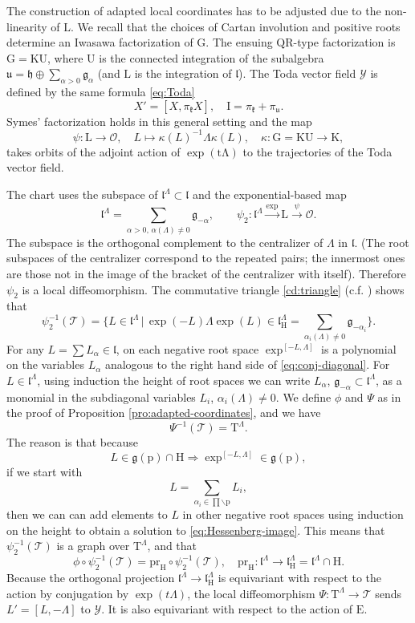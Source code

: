 \documentclass[reqno]{amsart}
\newcommand{\p}{\mathrm{p}}
\renewcommand{\gg}{\mathfrak{g}}
\newcommand{\hh}{\mathfrak{h}}
\newcommand{\kk}{\mathfrak{k}}
\renewcommand{\ll}{\mathfrak{l}}
\newcommand{\uu}{\mathfrak{u}}
\newcommand{\cO}{\mathcal{O}}
\newcommand{\cT}{\mathcal{T}}
\newcommand{\cY}{\mathcal{Y}}
\newcommand{\E}{\mathrm{E}}
\newcommand{\T}{\mathbb{T}}
\newcommand{\pr}{\mathrm{pr}}
\newcommand{\K}{\mathrm{K}}
\renewcommand{\L}{\mathrm{L}}
\renewcommand{\T}{\mathrm{T}}
\newcommand{\U}{\mathrm{U}}
\newcommand{\G}{\mathrm{G}}
\renewcommand{\H}{\mathrm{H}}
\begin{document}
The construction of adapted local coordinates has to be adjusted due to the non-linearity of $\L$. We recall that the choices of Cartan involution and positive roots determine an Iwasawa factorization of $\G$. The ensuing  $\mathrm{QR}$-type factorization is $\G=\K\U$, where $\U$ is the connected integration of the subalgebra $\uu=\hh\oplus\sum_{\alpha>0}\gg_\alpha$ (and $\L$ is the integration of $\ll$). The Toda vector field $\cY$ is defined by the same formula \eqref{eq:Toda}
\[X'=[X,\pi_{\kk}X],\quad \mathrm{I}=\pi_{\kk}+\pi_{\uu}.\]
Symes' factorization holds in this general setting and the map
\[\psi:\L\to \cO,\quad L\mapsto \kappa(L)^{-1}\Lambda \kappa(L),\quad \kappa:\G=\K\U\to  \K,\]
takes orbits of the adjoint action of $\mathrm{\exp(t\Lambda)}$ to the trajectories of the Toda vector field.

The chart uses the subspace of $\ll^\Lambda\subset \ll$ and the exponential-based map
\[ \ll^\Lambda=\sum_{\alpha>0,\,\alpha(\Lambda)\neq 0}\gg_{-\alpha},\qquad \psi_2:\ll^\Lambda\overset{\exp}{\longrightarrow} \L\overset{\psi}{\longrightarrow}\cO.\]
The subspace is the orthogonal complement to the centralizer of $\Lambda$ in $\ll$. (The root subspaces of the centralizer correspond to the repeated pairs; the innermost ones are those not in the image of the bracket of the centralizer with itself). Therefore   $\psi_2$ is a local diffeomorphism.
 The commutative triangle \eqref{cd:triangle} (c.f. \cite[Remark 6]{MT2}) shows that
\begin{equation}\label{eq:Hessenberg-image}\psi^{-1}_2(\cT)=\{L\in \ll^\Lambda\,|\, \exp(-L)\Lambda \exp(L)\in \ll^\Lambda_\H=\sum_{\alpha_i(\Lambda)\neq 0}\gg_{-\alpha_i}\}.\end{equation}
For any  $L=\sum L_\alpha \in \ll$, on each negative root space $\exp^{[-L,\Lambda]}$ is  a polynomial on the variables  $L_\alpha$ analogous to the right hand side of  \ref{eq:conj-diagonal}. For $L\in \ll^\Lambda$, using induction the height of root spaces we can write $L_{\alpha}$, $\gg_{-\alpha}\subset \ll^\Lambda$, as a monomial in the subdiagonal variables $L_i$, $\alpha_i(\Lambda)\neq 0$.
We define $\phi$ and $\Psi$ as in the proof of Proposition \ref{pro:adapted-coordinates},
and we have
\[\Psi^{-1}(\cT)=\T^\Lambda.\]
The reason is that because
\[L\in \gg(\p)\cap \H\Longrightarrow \exp^{[-L,\Lambda]}\in \gg(\p),\]
if we start with
\[L=\sum_{\alpha_i\in \prod\backslash \p} L_i,\]
 then we can  can add elements to $L$ in other negative root spaces using induction on the height  to obtain a solution to \eqref{eq:Hessenberg-image}. This means that $\psi_2^{-1}(\cT)$ is a graph over $\T^\Lambda$, and that
 \[\phi\circ \psi^{-1}_2(\cT)=\pr_\H\circ \psi_2^{-1}(\cT),\quad \pr_\H:\ll^\Lambda\to \ll^\Lambda_\H=\ll^\Lambda\cap \H.\]
 Because the orthogonal projection $\ll^\Lambda\to \ll^\Lambda_\H$ is equivariant with respect to the action by conjugation by $\exp(t\Lambda)$, the local diffeomorphism $\Psi:\T^\Lambda\to \cT$ sends $L'=[L,-\Lambda]$ to $\cY$. It is also equivariant with respect to the action of $\E$.
\end{document}
